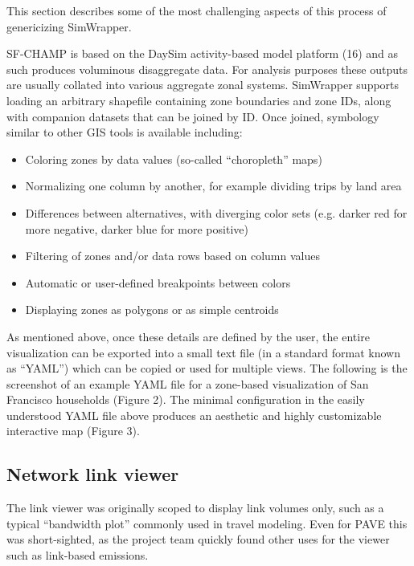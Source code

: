 \documentclass[3p,times,procedia]{elsarticle}
\begin{document}
This section describes some of the most challenging aspects of this
process of genericizing SimWrapper.


SF-CHAMP is based on the DaySim activity-based model platform (16) and as such produces voluminous disaggregate data. For analysis purposes these outputs are usually collated into various aggregate zonal systems. SimWrapper supports loading an arbitrary shapefile containing zone boundaries and zone IDs, along with companion datasets that can be joined by ID. Once joined, symbology similar to other GIS tools is available including:

\begin{itemize}
    \item Coloring zones by data values (so-called “choropleth” maps)
    \item Normalizing one column by another, for example dividing trips by land area
    \item Differences between alternatives, with diverging color sets (e.g. darker red for more negative, darker blue for more positive)
    \item Filtering of zones and/or data rows based on column values
    \item Automatic or user-defined breakpoints between colors
    \item Displaying zones as polygons or as simple centroids
\end{itemize}

As mentioned above, once these details are defined by the user, the entire visualization can be exported into a small text file (in a standard format known as “YAML”) which can be copied or used for multiple views. The following is the screenshot of an example YAML file for a zone-based visualization of San Francisco households (Figure 2). The minimal configuration in the easily understood YAML file above produces an aesthetic and highly customizable interactive map (Figure 3).


\subsection{Network link viewer}

The link viewer was originally scoped to display link volumes only, such
as a typical ``bandwidth plot'' commonly used in travel modeling. Even
for PAVE this was short-sighted, as the project team quickly found other
uses for the viewer such as link-based emissions.
\end{document}
